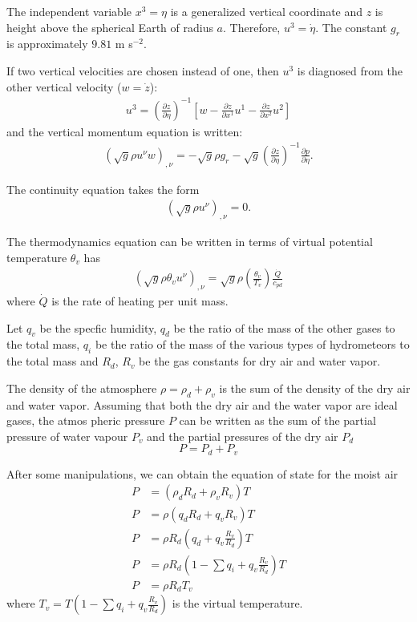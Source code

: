 \documentclass{article}
\begin{document}
The independent variable $x^3=\eta$ is a generalized vertical coordinate and $z$ is height above the spherical Earth of radius $a$. Therefore, $u^3=\dot\eta$. The constant $g_r$ is approximately $9.81$ m s$^{-2}$.

If two vertical velocities are chosen instead of one, then $u^3$ is diagnosed from the other vertical velocity ($w=\dot z$):
\begin{align}
u^3=\left(\frac{\partial z}{\partial \eta}\right)^{-1}\left[ w - \frac{\partial z}{\partial x^1} u^1 - \frac{\partial z}{\partial x^2} u^2 \right]
\end{align}
and the vertical momentum equation is written:
\begin{align}
\left(\sqrt{g}\rho u^\nu w\right)_{,\nu}=-\sqrt{g}\rho g_r-\sqrt{g} \left(\frac{\partial z}{\partial \eta}\right)^{-1} \frac{\partial p}{\partial\eta}.
\end{align}

The continuity equation takes the form
\begin{align}
\left( \sqrt{g}\rho u^\nu \right)_{,\nu} = 0.
\end{align}

The thermodynamics equation can be written in terms of virtual potential temperature $\theta_v$ has
\begin{align}
   \left( \sqrt{g}\rho \theta_v u^\nu \right)_{,\nu} = \sqrt{g} \rho \left( \frac{\theta_v}{T_v} \right) \frac{\dot{Q}}{c_{pd}}
\end{align}
where $\dot{Q}$ is the rate of heating per unit mass.

Let $q_v$ be the specfic humidity, $q_d$ be the ratio of the mass of the other gases to the total mass, $q_i$ be the ratio of the mass of the various types of hydrometeors to the total mass 
and $R_d$, $R_v$ be the gas constants for dry air and water vapor.


The density of the atmosphere $\rho = \rho_d + \rho_v$ is the sum of the density of the dry air and water vapor. Assuming that both the dry air and the water vapor are ideal gases, the atmos
pheric pressure $P$ can be written as the sum of the partial pressure of water vapour $P_v$ and the partial pressures of the dry air $P_d$
\begin{equation}
   P = P_d + P_v
\end{equation}

After some manipulations, we can obtain the equation of state for the moist air
\begin{align}
   P &= ( \rho_d R_d + \rho_v R_v ) T \\
   P &= \rho ( q_d R_d + q_v R_v ) T      \\
   P &= \rho R_d ( q_d + q_v \frac{R_v}{R_d} ) T      \\
   P &= \rho R_d ( 1 - \sum q_i + q_v \frac{R_v}{R_d} ) T      \\
   P &= \rho R_d T_v \label{eq:state}
\end{align}
where $T_v = T \left( 1 - \sum q_i + q_v \frac{R_v}{R_d} \right)$ is the virtual temperature.
\end{document}
